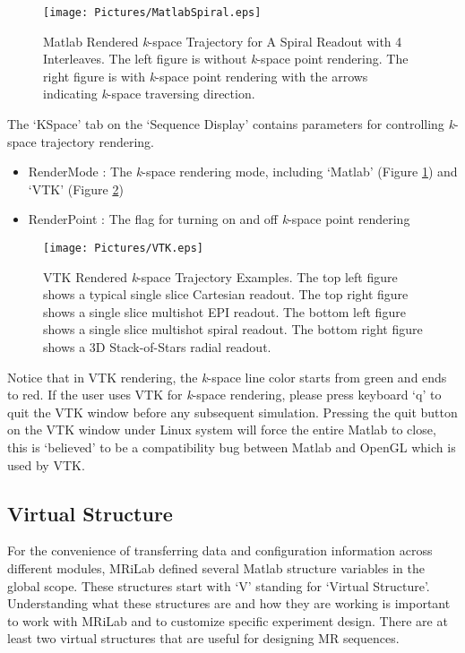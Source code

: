 \documentclass{book}%
\begin{document}
\begin{enumerate}
\begin{figure}[htbp]
	\centering
		\texttt{[image: Pictures/MatlabSpiral.eps]}
	\caption{Matlab Rendered \textit{k}-space Trajectory for A Spiral Readout with 4 Interleaves. The left figure is without \textit{k}-space point rendering. The right figure is with \textit{k}-space point rendering with the arrows indicating \textit{k}-space traversing direction.}
	\label{fig:MatlabSpiral}
\end{figure}	
	
The `KSpace' tab on the `Sequence Display' contains parameters for controlling \textit{k}-space trajectory rendering.

\begin{itemize}
	\item RenderMode : The \textit{k}-space rendering mode, including `Matlab' (Figure \ref{fig:MatlabSpiral}) and `VTK' (Figure \ref{fig:VTK})
	\item RenderPoint : The flag for turning on and off \textit{k}-space point rendering
\end{itemize}	

\begin{figure}[htbp]
	\centering
		\texttt{[image: Pictures/VTK.eps]}
	\caption{VTK Rendered \textit{k}-space Trajectory Examples. The top left figure shows a typical single slice Cartesian readout. The top right figure shows a single slice multishot EPI readout. The bottom left figure shows a single slice multishot spiral readout. The bottom right figure shows a 3D Stack-of-Stars radial readout.}
	\label{fig:VTK}
\end{figure}		
	
Notice that in VTK rendering, the \textit{k}-space line color starts from green and ends to red. If the user uses VTK for \textit{k}-space rendering, please press keyboard `q' to quit the VTK window before any subsequent simulation. Pressing the quit button on the VTK window under Linux system will force the entire Matlab to close, this is `believed' to be a compatibility bug between Matlab and OpenGL which is used by VTK.

\end{enumerate}	

\subsection{Virtual Structure}
For the convenience of transferring data and configuration information across different modules, MRiLab defined several Matlab structure variables in the global scope. These structures start with `V' standing for `Virtual Structure'. Understanding what these structures are and how they are working is important to work with MRiLab and to customize specific experiment design. There are at least two virtual structures that are useful for designing MR sequences.
\end{document}
